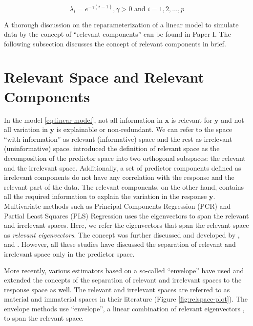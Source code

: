 \documentclass[11pt,twoside,openright,titlepage,
  headinclude,footinclude,BCOR=5mm,
  numbers=noenddot,cleardoublepage=empty,
  tablecaptionabove, dottedtoc,
  bibliography=totoc,paper=a4]{scrreprt}
\begin{document}
\begin{equation}
\lambda_i = e^{-\gamma(i - 1)}, \gamma >0 \text{ and } i = 1, 2, \ldots, p
\label{eq:exp-decay}
\end{equation}

A thorough discussion on the reparameterization of a linear model to simulate data by the concept of ``relevant components'' can be found in Paper I. The following subsection discusses the concept of relevant components in brief.

\hypertarget{relevant-space-and-relevant-components}{%
\section{Relevant Space and Relevant Components}\label{relevant-space-and-relevant-components}}

In the model \eqref{eq:linear-model}, not all information in \(\mathbf{x}\) is relevant for \(\mathbf{y}\) and not all variation in \(\mathbf{y}\) is explainable or non-redundant. We can refer to the space ``with information'' as relevant (informative) space and the rest as irrelevant (uninformative) space. \citet{Naes1985} introduced the definition of relevant space as the decomposition of the predictor space into two orthogonal subspaces: the relevant and the irrelevant space. Additionally, a set of predictor components defined as irrelevant components do not have any correlation with the response and the relevant part of the data. The relevant components, on the other hand, contains all the required information to explain the variation in the response \(\mathbf{y}\). Multivariate methods such as Principal Components Regression (PCR) and Partial Least Squares (PLS) Regression uses the eigenvectors to span the relevant and irrelevant spaces. Here, we refer the eigenvectors that span the relevant space as \emph{relevant eigenvectors}. The concept was further discussed and developed by \citet{helland1990partial}, \citet{naes1993relevant} and \citet{Helland1994b}. However, all these studies have discussed the separation of relevant and irrelevant space only in the predictor space.

More recently, various estimators \citep{cook2010envelope, cook2013envelopes, cook2015simultaneous} based on a so-called ``envelope'' \citep{Cook2007a} have used and extended the concepts of the separation of relevant and irrelevant spaces to the response space as well. The relevant and irrelevant spaces are referred to as material and immaterial spaces in their literature (Figure \ref{fig:relspace-plot}). The envelope methods use ``envelope'', a linear combination of relevant eigenvectors \citep{cook2018envelope}, to span the relevant space.
\end{document}
